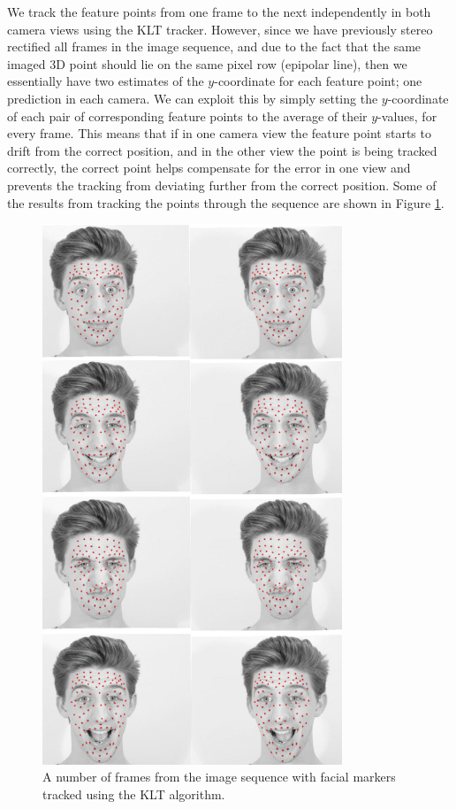 We track the feature points from one frame to the next independently in both camera views using the KLT tracker. However, since we have previously stereo rectified all frames in the image sequence, and due to the fact that the same imaged 3D point should lie on the same pixel row (epipolar line), then we essentially have two estimates of the $y$-coordinate for each feature point; one prediction in each camera. We can exploit this by simply setting the $y$-coordinate of each pair of corresponding feature points to the average of their $y$-values, for every frame. This means that if in one camera view the feature point starts to drift from the correct position, and in the other view the point is being tracked correctly, the correct point helps compensate for the error in one view and prevents the tracking from deviating further from the correct position. Some of the results from tracking the points through the sequence are shown in Figure \ref{fig:tracking}.

\begin{figure}[htbp!]
\centering
\includegraphics[width=0.8\textwidth]{img/tracking}
	\caption{A number of frames from the image sequence with facial markers tracked using the KLT algorithm.}
	\label{fig:tracking}
\end{figure}

